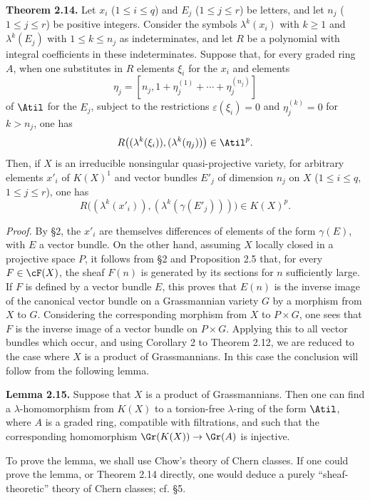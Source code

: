 \textbf{Theorem 2.14.} Let $x_i$ ($1\leq i\leq q$) and $E_j$ ($1\leq j\leq r$) be letters, and let $n_j$ ($1\leq j\leq r$) be positive integers. Consider the symbols $\lambda^k(x_i)$ with $k\geq 1$ and $\lambda^k(E_j)$ with $1\leq k\leq n_j$ as indeterminates, and let $R$ be a polynomial with integral coefficients in these indeterminates. Suppose that, for every graded ring $A$, when one substitutes in $R$ elements $\xi_i$ for the $x_i$ and elements
\[
 \eta_j=[n_j,1+\eta_j^{(1)}+\cdots+\eta_j^{(n_j)}]
\]
of $\Atil$ for the $E_j$, subject to the restrictions $\varepsilon(\xi_i)=0$ and $\eta_j^{(k)}=0$ for $k>n_j$, one has
\[
 R\bigl((\lambda^k(\xi_i)),(\lambda^k(\eta_j))\bigr)\in \Atil^p.
\]
Then, if $X$ is an irreducible nonsingular quasi-projective variety, for arbitrary elements $x'_i$ of $K(X)^1$ and vector bundles $E'_j$ of dimension $n_j$ on $X$ ($1\leq i\leq q$, $1\leq j\leq r$), one has
\begin{equation}\tag{*}
 R\bigl((\lambda^k(x'_i)),(\lambda^k(\gamma(E'_j)))\bigr)\in K(X)^p.
\end{equation}

\emph{Proof.} By \S 2, the $x'_i$ are themselves differences of elements of the form $\gamma(E)$, with $E$ a vector bundle. On the other hand, assuming $X$ locally closed in a projective space $P$, it follows from \S 2 and Proposition 2.5 that, for every $F\in\cF(X)$, the sheaf $F(n)$ is generated by its sections for $n$ sufficiently large. If $F$ is defined by a vector bundle $E$, this proves that $E(n)$ is the inverse image of the canonical vector bundle on a Grassmannian variety $G$ by a morphism from $X$ to $G$. Considering the corresponding morphism from $X$ to $P\times G$, one sees that $F$ is the inverse image of a vector bundle on $P\times G$. Applying this to all vector bundles which occur, and using Corollary 2 to Theorem 2.12, we are reduced to the case where $X$ is a product of Grassmannians. In this case the conclusion will follow from the following lemma.

\textbf{Lemma 2.15.} Suppose that $X$ is a product of Grassmannians. Then one can find a $\lambda$-homomorphism from $K(X)$ to a torsion-free $\lambda$-ring of the form $\Atil$, where $A$ is a graded ring, compatible with filtrations, and such that the corresponding homomorphism $\Gr(K(X))\to\Gr(A)$ is injective.

To prove the lemma, we shall use Chow's theory of Chern classes. If one could prove the lemma, or Theorem 2.14 directly, one would deduce a purely ``sheaf-theoretic'' theory of Chern classes; cf. \S 5.


